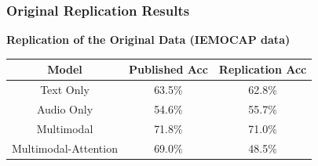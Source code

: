 \documentclass{beamer}
\begin{document}


    
    




\begin{frame}
\frametitle{Original Replication Results}
 \textbf{Replication of the Original Data (IEMOCAP data)}      

            \begin{center}
                \begin{tabular}{||c c c||} 
                 \hline
                 Model & Published Acc  & Replication Acc\\ [0.2ex] 
                 \hline\hline
                 Text Only & 63.5\% & 62.8\%\\ 
                 \hline
                 Audio Only & 54.6\%  &   55.7\%\\
                 \hline
                 Multimodal & 71.8\% & 71.0\%\\
                 \hline
                 Multimodal-Attention & 69.0\%  & 48.5\%\\
                 \hline
                \end{tabular}
            \end{center}
 
\end{frame}
\end{document}
